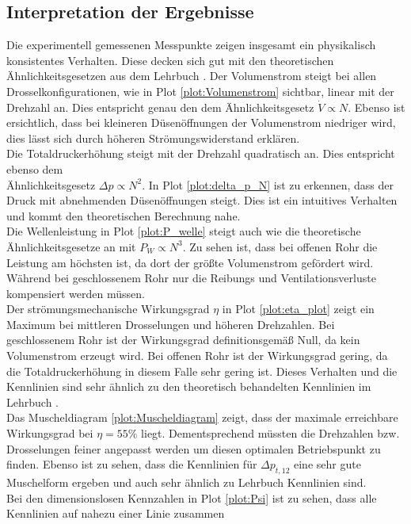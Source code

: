 \documentclass[pdfpaper,openbib, twoside, titlepage, halfparskip-,a4paper, 10pt]{scrarticle}
\begin{document}
\clearpage
\subsection{Interpretation der Ergebnisse}
Die experimentell gemessenen Messpunkte zeigen insgesamt ein physikalisch konsistentes Verhalten. Diese 
decken sich gut mit den theoretischen Ähnlichkeitsgesetzen aus dem Lehrbuch \cite{Lehrbuch}. %
Der Volumenstrom steigt bei allen Drosselkonfigurationen, wie in Plot \ref{plot:Volumenstrom} sichtbar, linear mit der Drehzahl an. Dies entspricht genau den dem Ähnlichkeitsgesetz
$\dot{V} \propto N$. Ebenso ist ersichtlich, dass bei kleineren Düsenöffnungen der Volumenstrom niedriger wird, dies lässt sich durch höheren Strömungswiderstand erklären. \\
Die Totaldruckerhöhung steigt mit der Drehzahl quadratisch an. Dies entspricht ebenso dem
\\ Ähnlichkeitsgesetz $\Delta p \propto N^2$.
In Plot \ref{plot:delta_p_N} ist zu erkennen, dass der Druck mit abnehmenden Düsenöffnungen steigt. Dies ist ein
intuitives Verhalten und kommt den theoretischen Berechnung nahe. \\
Die Wellenleistung in Plot \ref{plot:P_welle} steigt auch wie die theoretische Ähnlichkeitsgesetze an mit $P_{W} \propto N^3$.
Zu sehen ist, dass bei offenen Rohr die Leistung am höchsten ist, da dort der größte Volumenstrom gefördert wird. Während bei geschlossenem Rohr nur
die Reibungs und Ventilationsverluste kompensiert werden müssen.\\
Der strömungsmechanische Wirkungsgrad $\eta$ in Plot \ref{plot:eta_plot} zeigt ein Maximum bei mittleren Drosselungen und höheren
Drehzahlen. Bei geschlossenem Rohr
ist der Wirkungsgrad definitionsgemäß Null, da kein Volumenstrom erzeugt wird. Bei offenen Rohr ist der Wirkungsgrad gering,
da die Totaldruckerhöhung in diesem Falle sehr gering ist. Dieses Verhalten und die Kennlinien sind sehr ähnlich zu den theoretisch
behandelten Kennlinien im Lehrbuch \cite{Lehrbuch}.\\
Das Muscheldiagram \ref{plot:Muscheldiagram} zeigt, dass der maximale erreichbare Wirkungsgrad bei $\eta = 55 \%$ liegt. Dementsprechend müssten die Drehzahlen bzw. Drosselungen feiner angepasst werden um diesen optimalen Betriebspunkt zu finden. Ebenso ist zu sehen, dass die
Kennlinien für $\Delta p_{t,12}$ eine sehr gute Muschelform ergeben und auch sehr ähnlich zu Lehrbuch Kennlinien sind. \\
Bei den dimensionslosen Kennzahlen in Plot \ref{plot:Psi} ist zu sehen, dass alle Kennlinien auf nahezu einer Linie zusammen
\end{document}
